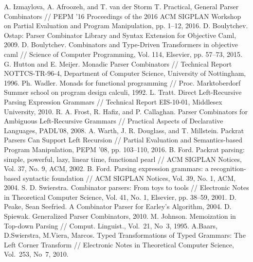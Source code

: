 \documentclass[conference]{IEEEtran}
\begin{document}
\begin{thebibliography}{00}
 A. Izmaylova, A. Afroozeh, and T. van der Storm T. Practical, General Parser Combinators // PEPM '16 Proceedings of the 2016 ACM SIGPLAN Workshop on Partial Evaluation and Program Manipulation, pp. 1--12, 2016.
 D. Boulytchev. Ostap: Parser Combinator Library and Syntax Extension for Objective Caml, 2009.
 D. Boulytchev. Combinators and Type-Driven Transformers in objective caml // Science of Computer Programming, Vol. 114, Elsevier, pp. 57--73, 2015.
 G. Hutton and E. Meijer. Monadic Parser Combinators // Technical Report NOTTCS-TR-96-4, Department of Computer Science, University of Nottingham, 1996.
 Ph. Wadler. Monads for functional programming // Proc. Marktoberdorf Summer school on program design calculi, 1992.
 L. Tratt. Direct Left-Recursive Parsing Expression Grammars // Technical Report EIS-10-01, Middlesex University, 2010.
 R. A. Frost, R. Hafiz, and P. Callaghan. Parser Combinators for Ambiguous Left-Recursive Grammars // Practical Aspects of Declarative Languages, PADL’08, 2008.
 A. Warth, J. R. Douglass, and T. Millstein. Packrat Parsers Can Support Left Recursion // Partial Evaluation and Semantics-based Program Manipulation, PEPM ’08, pp. 103--110, 2016.
 B. Ford. Packrat parsing: simple, powerful, lazy, linear time, functional pearl // ACM SIGPLAN Notices, Vol. 37, No. 9, ACM, 2002.
 B. Ford. Parsing expression grammars: a recognition-based syntactic foundation // ACM SIGPLAN Notices, Vol. 39, No. 1, ACM, 2004.
 S. D. Swierstra. Combinator parsers: From toys to tools // Electronic Notes in Theoretical Computer Science, Vol. 41, No. 1, Elsevier, pp. 38--59, 2001.
 D. Peake, Sean Seefried. A Combinator Parser for Earley's Algorithm, 2004.
 D. Spiewak. Generalized Parser Combinators, 2010.
 M. Johnson. Memoization in Top-down Parsing // Comput. Linguist., Vol.~21, No~3, 1995.
 A.Baars, D.Swierstra, M.Viera, Marcos. Typed Transformations of Typed Grammars: The Left Corner Transform // Electronic Notes in Theoretical Computer
Science,  Vol.~253, No~7, 2010.
\end{thebibliography}
\end{document}
